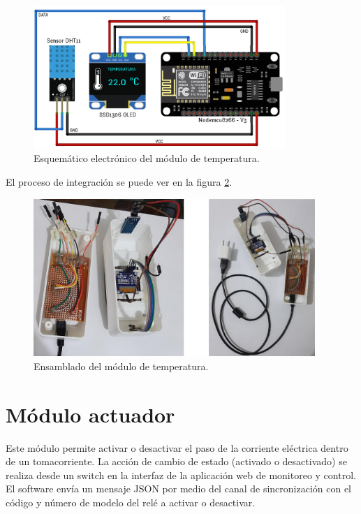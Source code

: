 \begin{figure}[htpb]
\centering 
\includegraphics[width=0.85\textwidth]{./Figures/ci-temp.png}
\caption{Esquemático electrónico del módulo de temperatura. }
\label{fig:citemp}
\end{figure}

\vspace{0.5cm}
El proceso de integración se puede ver en la figura \ref{fig:entemp}.

\begin{figure}[htpb]
\centering 
\includegraphics[width=0.95\textwidth]{./Figures/temperatura.jpg}
\caption{Ensamblado del módulo de temperatura. }
\label{fig:entemp}
\end{figure}

\section{Módulo actuador}

Este módulo permite activar o desactivar el paso de la corriente eléctrica dentro de un tomacorriente. La acción de cambio de estado (activado o desactivado) se realiza desde un switch en la interfaz de la aplicación web de monitoreo y control. El software envía un mensaje JSON por medio del canal de sincronización con el código y número de modelo del relé a activar o desactivar.

